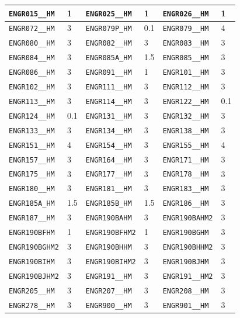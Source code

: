 \begin{longtable}{|l|l||l|l||l|l|}
    \verb|ENGR015__HM| & 1 & \verb|ENGR025__HM| & 1 & \verb|ENGR026__HM| & 1\\\hline
    \verb|ENGR072__HM| & 3 & \verb|ENGR079P_HM| & 0.1 & \verb|ENGR079__HM| & 4\\\hline
    \verb|ENGR080__HM| & 3 & \verb|ENGR082__HM| & 3 & \verb|ENGR083__HM| & 3\\\hline
    \verb|ENGR084__HM| & 3 & \verb|ENGR085A_HM| & 1.5 & \verb|ENGR085__HM| & 3\\\hline
    \verb|ENGR086__HM| & 3 & \verb|ENGR091__HM| & 1 & \verb|ENGR101__HM| & 3\\\hline
    \verb|ENGR102__HM| & 3 & \verb|ENGR111__HM| & 3 & \verb|ENGR112__HM| & 3\\\hline
    \verb|ENGR113__HM| & 3 & \verb|ENGR114__HM| & 3 & \verb|ENGR122__HM| & 0.1\\\hline
    \verb|ENGR124__HM| & 0.1 & \verb|ENGR131__HM| & 3 & \verb|ENGR132__HM| & 3\\\hline
    \verb|ENGR133__HM| & 3 & \verb|ENGR134__HM| & 3 & \verb|ENGR138__HM| & 3\\\hline
    \verb|ENGR151__HM| & 4 & \verb|ENGR154__HM| & 3 & \verb|ENGR155__HM| & 4\\\hline
    \verb|ENGR157__HM| & 3 & \verb|ENGR164__HM| & 3 & \verb|ENGR171__HM| & 3\\\hline
    \verb|ENGR175__HM| & 3 & \verb|ENGR177__HM| & 3 & \verb|ENGR178__HM| & 3\\\hline
    \verb|ENGR180__HM| & 3 & \verb|ENGR181__HM| & 3 & \verb|ENGR183__HM| & 3\\\hline
    \verb|ENGR185A_HM| & 1.5 & \verb|ENGR185B_HM| & 1.5 & \verb|ENGR186__HM| & 3\\\hline
    \verb|ENGR187__HM| & 3 & \verb|ENGR190BAHM| & 3 & \verb|ENGR190BAHM2| & 3\\\hline
    \verb|ENGR190BFHM| & 1 & \verb|ENGR190BFHM2| & 1 & \verb|ENGR190BGHM| & 3\\\hline
    \verb|ENGR190BGHM2| & 3 & \verb|ENGR190BHHM| & 3 & \verb|ENGR190BHHM2| & 3\\\hline
    \verb|ENGR190BIHM| & 3 & \verb|ENGR190BIHM2| & 3 & \verb|ENGR190BJHM| & 3\\\hline
    \verb|ENGR190BJHM2| & 3 & \verb|ENGR191__HM| & 3 & \verb|ENGR191__HM2| & 3\\\hline
    \verb|ENGR205__HM| & 3 & \verb|ENGR207__HM| & 3 & \verb|ENGR208__HM| & 3\\\hline
    \verb|ENGR278__HM| & 3 & \verb|ENGR900__HM| & 3 & \verb|ENGR901__HM| & 3\\\hline

\end{longtable}
